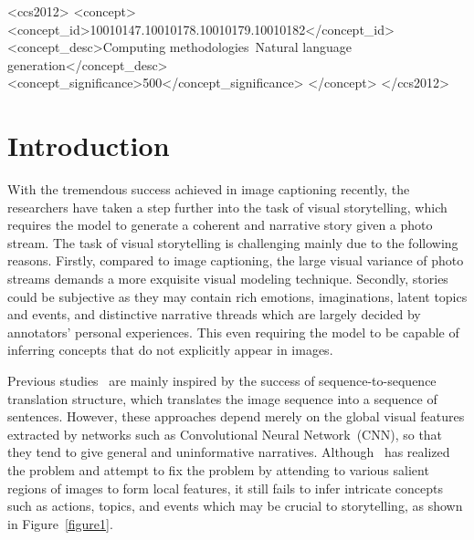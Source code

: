 \documentclass[sigconf]{acmart}
\begin{document}
\begin{CCSXML}
<ccs2012>
<concept>
<concept_id>10010147.10010178.10010179.10010182</concept_id>
<concept_desc>Computing methodologies~Natural language generation</concept_desc>
<concept_significance>500</concept_significance>
</concept>
</ccs2012>
\end{CCSXML}





\maketitle

\section{Introduction}

With the tremendous success achieved in image captioning recently, the researchers have taken a step further into the task of visual storytelling, which requires the model to generate a coherent and narrative story given a photo stream. The task of visual storytelling is challenging mainly due to the following reasons. Firstly, compared to image captioning, the large visual variance of photo streams demands a more exquisite visual modeling technique. Secondly, stories could be subjective as they may contain rich emotions, imaginations, latent topics and events, and distinctive narrative threads which are largely decided by annotators' personal experiences. This even requiring the model to be capable of inferring concepts that do not explicitly appear in images.

Previous studies~\cite{huang2016visual, Kim18, WangFu18, Huang18, wang2018no, Hsu18} are mainly inspired by the success of sequence-to-sequence translation structure, which translates the image sequence into a sequence of sentences. However, these approaches depend merely on the global visual features extracted by networks such as Convolutional Neural Network~(CNN), so that they tend to give general and uninformative narratives. Although~\cite{WangHanQi17} has realized the problem and attempt to fix the problem by attending to various salient regions of images to form local features, it still fails to infer intricate concepts such as actions, topics, and events which may be crucial to storytelling, as shown in Figure~\ref{figure1}.
\end{document}

